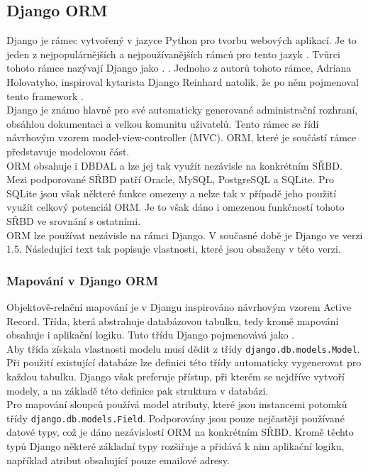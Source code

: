 \documentclass[ing,male,java,dept456]{diploma}						%
\begin{document}

\subsection{Django ORM}

Django je rámec vytvořený v jazyce Python pro tvorbu webových aplikací. Je to jeden z nejpopulárnějších a nejpoužívanějších rámců pro tento jazyk \cite{pwiki}. Tvůrci tohoto rámce nazývají Django jako .  \cite{django.cz}. Jednoho z autorů tohoto rámce, Adriana Holovatyho, inspiroval kytarista Django Reinhard natolik, že po něm pojmenoval tento framework \cite{aholovaty}.  \\

Django je známo hlavně pro své automaticky generované administrační rozhraní, obsáhlou dokumentaci a velkou komunitu uživatelů. Tento rámec se řídí návrhovým vzorem model-view-controller (MVC). ORM, které je součástí rámce představuje modelovou část. \\ 
ORM obsahuje i DBDAL a lze jej tak využít nezávisle na konkrétním SŘBD. Mezi podporované SŘBD patří Oracle, MySQL, PostgreSQL a SQLite. Pro SQLite jsou však některé funkce omezeny a nelze tak v případě jeho použití využít celkový potenciál ORM. Je to však dáno i omezenou funkčností tohoto SŘBD ve srovnání s ostatními. \\
ORM lze používat nezávisle na rámci Django. V současné době je Django ve verzi 1.5. Následující text tak popisuje vlastnosti, které jsou obsaženy v této verzi.

\subsubsection{Mapování v Django ORM}

Objektově-relační mapování je v Djangu inspirováno návrhovým vzorem Active Record. Třída, která abstrahuje databázovou tabulku, tedy kromě mapování obsahuje i aplikační logiku. Tuto třídu Django pojmenovává jako . \\
Aby třída získala vlastnosti modelu musí dědit z třídy \lstinline[style=custompython]|django.db.models.Model|. Při použití existující databáze lze definici této třídy automaticky vygenerovat pro každou tabulku. Django však preferuje přístup, při kterém se nejdříve vytvoří modely, a na základě této definice pak struktura v databázi. \\
Pro mapování sloupců používá model atributy, které jsou instancemi potomků třídy \lstinline[style=custompython]|django.db.models.Field|. Podporovány jsou pouze nejčastěji používané datové typy, což je dáno nezávislostí ORM na konkrétním SŘBD. Kromě těchto typů Django některé základní typy rozšiřuje a přidává k nim aplikační logiku, například atribut obsahující pouze emailové adresy. \\
\end{document}
